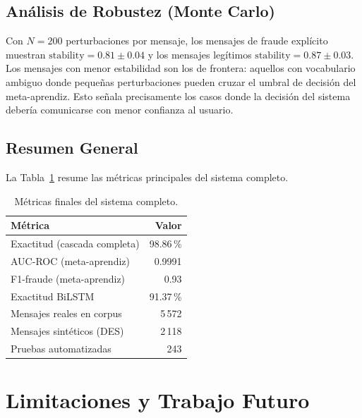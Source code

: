 \documentclass{llncs}
\begin{document}
\subsection{Análisis de Robustez (Monte Carlo)}

Con $N=200$ perturbaciones por mensaje,
los mensajes de fraude explícito muestran
$\mathrm{stability}=0.81 \pm 0.04$
y los mensajes legítimos $\mathrm{stability}=0.87 \pm 0.03$.
Los mensajes con menor estabilidad son los de frontera:
aquellos con vocabulario ambiguo donde pequeñas perturbaciones
pueden cruzar el umbral de decisión del meta-aprendiz.
Esto señala precisamente los casos donde la decisión del sistema
debería comunicarse con menor confianza al usuario.

\subsection{Resumen General}

La Tabla~\ref{tab:final} resume las métricas principales
del sistema completo.

\begin{table}[t]
\caption{Métricas finales del sistema completo.}
\label{tab:final}
\centering
\begin{tabular}{lr}
\toprule
Métrica & Valor \\
\midrule
Exactitud (cascada completa) & 98.86\,\% \\
AUC-ROC (meta-aprendiz)      & 0.9991 \\
F1-fraude (meta-aprendiz)    & 0.93 \\
Exactitud BiLSTM             & 91.37\,\% \\
Mensajes reales en corpus    & 5\,572 \\
Mensajes sintéticos (DES)    & 2\,118 \\
Pruebas automatizadas        & 243 \\
\bottomrule
\end{tabular}
\end{table}

\section{Limitaciones y Trabajo Futuro}
\label{sec:limitations}
\end{document}
